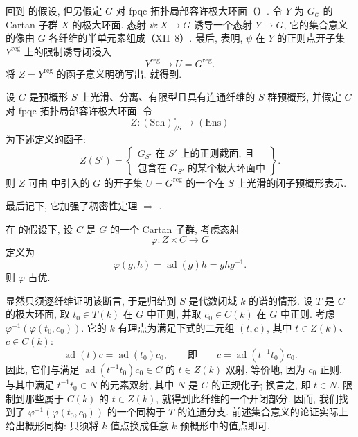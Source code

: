 回到  的假设, 但另假定 \(G\) 对 fpqc 拓扑局部容许极大环面（）. 令 \(Y\) 为 \(G_{\mathcal C}\) 的 Cartan 子群 \(X\) 的极大环面. 态射 \(\psi:X\to G\) 诱导一个态射 \(Y\to G\), 它的集合意义的像由 \(G\) 各纤维的半单元素组成（XII~8）. 最后,  表明, \(\psi\) 在 \(Y\) 的正则点开子集 \(Y^{\mathrm{reg}}\) 上的限制诱导闭浸入
\[
  Y^{\mathrm{reg}}\longrightarrow U=G^{\mathrm{reg}}.
\]
将 \(Z=Y^{\mathrm{reg}}\) 的函子意义明确写出, 就得到.

\begin{corollary}
设 \(G\) 是预概形 \(S\) 上光滑、分离、有限型且具有连通纤维的 \(S\)-群预概形, 并假定 \(G\) 对 fpqc 拓扑局部容许极大环面. 令
\[
  Z:(\mathrm{Sch})^\circ_{/S}\longrightarrow(\mathrm{Ens})
\]
为下述定义的函子:
\[
  Z(S')
  =
  \left\{
    \begin{array}{c}
      \text{\(G_{S'}\) 在 \(S'\) 上的正则截面, 且}\\
      \text{包含在 \(G_{S'}\) 的某个极大环面中}
    \end{array}
  \right\}.
\]
则 \(Z\) 可由  中引入的 \(G\) 的开子集 \(U=G^{\mathrm{reg}}\) 的一个在 \(S\) 上光滑的闭子预概形表示.
\end{corollary}

最后记下, 它加强了稠密性定理   \(\Rightarrow\) .

\begin{corollary}
在  的假设下, 设 \(C\) 是 \(G\) 的一个 Cartan 子群, 考虑态射
\[
  \varphi:Z\times C\longrightarrow G
\]
定义为
\[
  \varphi(g,h)=\operatorname{ad}(g)h=ghg^{-1}.
\]
则 \(\varphi\) 占优.
\end{corollary}

显然只须逐纤维证明该断言, 于是归结到 \(S\) 是代数闭域 \(k\) 的谱的情形. 设 \(T\) 是 \(C\) 的极大环面, 取 \(t_0\in T(k)\) 在 \(G\) 中正则, 并取 \(c_0\in C(k)\) 在 \(G\) 中正则. 考虑 \(\varphi^{-1}(\varphi(t_0,c_0))\). 它的 \(k\)-有理点为满足下式的二元组 \((t,c)\), 其中 \(t\in Z(k)\)、\(c\in C(k)\):
\[
  \operatorname{ad}(t)c=\operatorname{ad}(t_0)c_0,
  \qquad\text{即}\qquad
  c=\operatorname{ad}(t^{-1}t_0)c_0.
\]
因此, 它们与满足 \(\operatorname{ad}(t^{-1}t_0)c_0\in C\) 的 \(t\in Z(k)\) 双射, 等价地, 因为 \(c_0\) 正则, 与其中满足 \(t^{-1}t_0\in N\) 的元素双射, 其中 \(N\) 是 \(C\) 的正规化子; 换言之, 即 \(t\in N\). 限制到那些属于 \(C(k)\) 的 \(t\in Z(k)\), 就得到此纤维的一个开闭部分. 因而, 我们找到了 \(\varphi^{-1}(\varphi(t_0,c_0))\) 的一个同构于 \(T\) 的连通分支. 前述集合意义的论证实际上给出概形同构: 只须将 \(k\)-值点换成任意 \(k\)-预概形中的值点即可.

